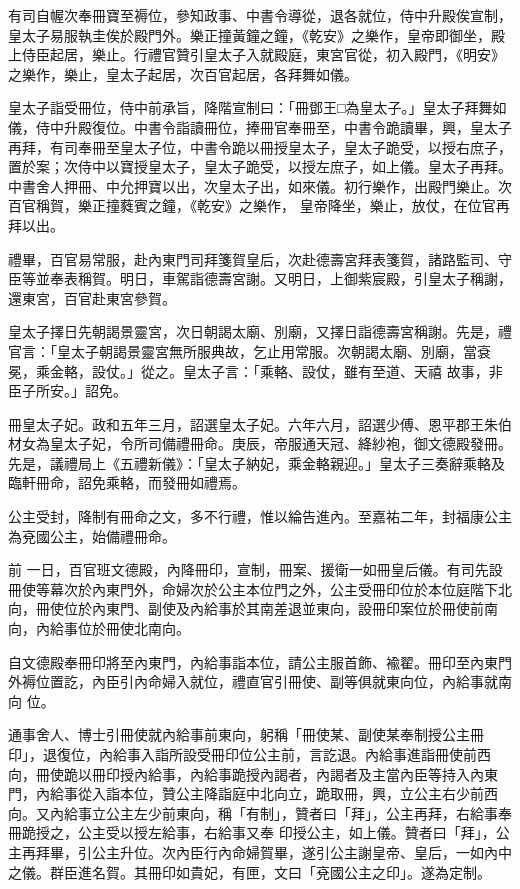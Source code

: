 \begin{pinyinscope}
 有司自幄次奉冊寶至褥位，參知政事、中書令導從，退各就位，侍中升殿俟宣制，皇太子易服執圭俟於殿門外。樂正撞黃鐘之鐘，《乾安》之樂作，皇帝即御坐，殿上侍臣起居，樂止。行禮官贊引皇太子入就殿庭，東宮官從，初入殿門，《明安》之樂作，樂止，皇太子起居，次百官起居，各拜舞如儀。



 皇太子詣受冊位，侍中前承旨，降階宣制曰：「冊鄧王□為皇太子。」皇太子拜舞如儀，侍中升殿復位。中書令詣讀冊位，捧冊官奉冊至，中書令跪讀畢，興，皇太子再拜，有司奉冊至皇太子位，中書令跪以冊授皇太子，皇太子跪受，以授右庶子，置於案；次侍中以寶授皇太子，皇太子跪受，以授左庶子，如上儀。皇太子再拜。中書舍人押冊、中允押寶以出，次皇太子出，如來儀。初行樂作，出殿門樂止。次百官稱賀，樂正撞蕤賓之鐘，《乾安》之樂作，
 皇帝降坐，樂止，放仗，在位官再拜以出。



 禮畢，百官易常服，赴內東門司拜箋賀皇后，次赴德壽宮拜表箋賀，諸路監司、守臣等並奉表稱賀。明日，車駕詣德壽宮謝。又明日，上御紫宸殿，引皇太子稱謝，還東宮，百官赴東宮參賀。



 皇太子擇日先朝謁景靈宮，次日朝謁太廟、別廟，又擇日詣德壽宮稱謝。先是，禮官言：「皇太子朝謁景靈宮無所服典故，乞止用常服。次朝謁太廟、別廟，當袞冕，乘金輅，設仗。」從之。皇太子言：「乘輅、設仗，雖有至道、天禧
 故事，非臣子所安。」詔免。



 冊皇太子妃。政和五年三月，詔選皇太子妃。六年六月，詔選少傅、恩平郡王朱伯材女為皇太子妃，令所司備禮冊命。庚辰，帝服通天冠、絳紗袍，御文德殿發冊。先是，議禮局上《五禮新儀》：「皇太子納妃，乘金輅親迎。」皇太子三奏辭乘輅及臨軒冊命，詔免乘輅，而發冊如禮焉。



 公主受封，降制有冊命之文，多不行禮，惟以綸告進內。至嘉祐二年，封福康公主為兗國公主，始備禮冊命。



 前
 一日，百官班文德殿，內降冊印，宣制，冊案、援衛一如冊皇后儀。有司先設冊使等幕次於內東門外，命婦次於公主本位門之外，公主受冊印位於本位庭階下北向，冊使位於內東門、副使及內給事於其南差退並東向，設冊印案位於冊使前南向，內給事位於冊使北南向。



 自文德殿奉冊印將至內東門，內給事詣本位，請公主服首飾、褕翟。冊印至內東門外褥位置訖，內臣引內命婦入就位，禮直官引冊使、副等俱就東向位，內給事就南向
 位。



 通事舍人、博士引冊使就內給事前東向，躬稱「冊使某、副使某奉制授公主冊印」，退復位，內給事入詣所設受冊印位公主前，言訖退。內給事進詣冊使前西向，冊使跪以冊印授內給事，內給事跪授內謁者，內謁者及主當內臣等持入內東門，內給事從入詣本位，贊公主降詣庭中北向立，跪取冊，興，立公主右少前西向。又內給事立公主左少前東向，稱「有制」，贊者曰「拜」，公主再拜，右給事奉冊跪授之，公主受以授左給事，右給事又奉
 印授公主，如上儀。贊者曰「拜」，公主再拜畢，引公主升位。次內臣行內命婦賀畢，遂引公主謝皇帝、皇后，一如內中之儀。群臣進名賀。其冊印如貴妃，有匣，文曰「兗國公主之印」。遂為定制。




\end{pinyinscope}
